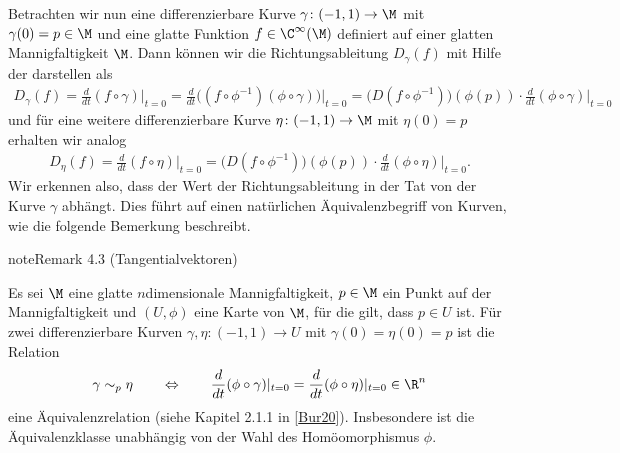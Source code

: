 \documentclass[letterpaper,10pt,german]{jupyterBook}
\begin{document}
\sphinxAtStartPar
Betrachten wir nun eine differenzierbare Kurve \(\gamma \colon (-1, 1) \rightarrow \M\) mit \(\gamma(0)=p \in \M\) und eine glatte Funktion \(f \in \C^\infty(\M)\) definiert auf einer glatten Mannigfaltigkeit \(\M\).
Dann können wir die Richtungsableitung \(D_\gamma(f)\) mit Hilfe der  darstellen als
\begin{equation*}
\begin{split}D_\gamma(f) = \frac{d}{dt}(f\circ \gamma)\big\rvert_{t=0} = \frac{d}{dt}\big( (f\circ \phi^{-1}) (\phi \circ \gamma) \big)\rvert_{t=0} = 
\big(D(f\circ \phi^{-1})\big)(\phi(p))\cdot \frac{d}{dt}(\phi \circ \gamma)\rvert_{t=0}\end{split}
\end{equation*}
\sphinxAtStartPar
und für eine weitere differenzierbare Kurve \(\eta \colon (-1, 1) \rightarrow \M\) mit \(\eta(0)=p\) erhalten wir analog
\begin{equation*}
\begin{split}D_\eta(f) = \frac{d}{dt}(f\circ \eta)\big\rvert_{t=0} = 
\big(D(f\circ \phi^{-1})\big)(\phi(p))\cdot \frac{d}{dt}(\phi \circ \eta)\rvert_{t=0}.\end{split}
\end{equation*}
\sphinxAtStartPar
Wir erkennen also, dass der Wert der Richtungsableitung in der Tat von der Kurve \(\gamma\) abhängt.
Dies führt auf einen natürlichen Äquivalenzbegriff von Kurven, wie die folgende Bemerkung beschreibt.
\label{manifolds/tangential:rem:tang}
\begin{sphinxadmonition}{note}{Remark 4.3 (Tangentialvektoren)}



\sphinxAtStartPar
Es sei \(\M\) eine glatte \(n\)\sphinxhyphen{}dimensionale Mannigfaltigkeit, \(p\in\M\) ein Punkt auf der Mannigfaltigkeit und \((U,\phi)\) eine Karte von \(\M\), für die gilt, dass \(p\in U\) ist.
Für zwei differenzierbare Kurven \(\gamma, \eta:(-1,1) \to U\) mit \(\gamma(0) = \eta(0) = p\) ist die Relation
\begin{equation*}
\begin{split}\gamma \sim_p \eta
\qquad \Leftrightarrow \qquad
\frac{d}{dt}(\phi \circ \gamma)\rvert_{t=0} = \frac{d}{dt}(\phi \circ \eta)\rvert_{t=0}\in \R^n\end{split}
\end{equation*}
\sphinxAtStartPar
eine Äquivalenzrelation (siehe Kapitel 2.1.1 in {[}\hyperlink{cite.references:id2}{Bur20}{]}).
Insbesondere ist die Äquivalenzklasse unabhängig von der Wahl des Homöomorphismus \(\phi\).
\end{sphinxadmonition}
\end{document}
